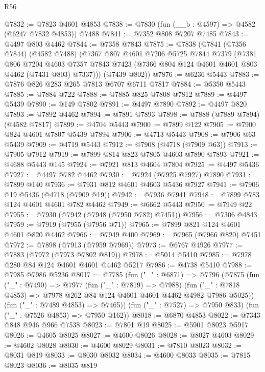 \begin{lexlean}{R56}
\begin{coremodule}
@7832 := @7823 @4601 @4853
@7838 := @7830 (fun (__b : @4597) => @4582 (@6247 @7832 @4853)) @7488
@7841 := @7352 @808 @7207 @7485
@7843 := @4497 @803 @4462
@7844 := @7358 @7843
@7875 := @7838
    (@7841
      (@7356 @7844)
      (@4582 @7488)
      (@7367
        @807
        @4601
        @7206
        @5725
        @7844
        @7379
        (@7381
          @806
          @7204
          @4603
          @7357
          @7843
          @7423
          (@7366 @804 @124 @4601 @4601 @803 @4462 (@7431 @803) @7337)))
      (@7439 @802))
@7876 := @6236 @5443
@7883 := @7876 @826 @283 @265 @7813 @6707 @6711 @7817
@7884 := @5350 @5443
@7885 := @7884 @722
@7888 := @7885 @825 @7808 @7812
@7889 := @4497 @5439
@7890 := @149 @7802
@7891 := @4497 @7890
@7892 := @4497 @820
@7893 := @7892 @4462
@7894 := @7891 @7893
@7898 := @7888 (@7889 @7894) (@4582 @7817)
@7899 := @4704 @5443
@7900 := @7899 @122
@7905 := @7900 @824 @4601 @7807 @5439 @7894
@7906 := @4713 @5443
@7908 := @7906 @63 @5439
@7909 := @4719 @5443
@7912 := @7908 (@4718 (@7909 @63))
@7913 := @7905 @7912
@7919 := @7899 @814 @823 @7805 @4603 @7890 @7893
@7921 := @4688 @5443 @145
@7924 := @7921 @813 @4604 @7804
@7925 := @4497 @5436
@7927 := @4497 @782 @4462
@7930 := @7924 (@7925 @7927) @7890
@7931 := @7899 @140
@7936 := @7931 @812 @4601 @4603 @5436 @7927
@7941 := @7906 @19 @5436 (@4718 (@7909 @19))
@7942 := @7936 @7941
@7948 := @7899 @783 @124 @4601 @4601 @782 @4462
@7949 := @6662 @5443
@7950 := @7949 @22
@7955 := @7930 (@7942 (@7948 (@7950 @782) @7451))
@7956 := @7306 @4843
@7959 := @7919 (@7955 (@7956 @71))
@7965 := @7899 @821 @124 @4601 @4601 @820 @4462
@7966 := @7949 @400
@7969 := @7965 (@7966 @820) @7451
@7972 := @7898 (@7913 (@7959 @7969))
@7973 := @6767 @4926
@7977 := @7883 (@7972 (@7973 @7802 @819))
@7978 := @5014 @5410
@7985 := @7978 @280 @84 @124 @4601 @4601 @4462 @5217
@7986 := @4738 @5410
@7988 := @7985 @7986 @5236
@8017 := @7785
    (fun ("_" : @6871) =>
    @7796
      (@7875
        (fun ("_" : @7490) =>
        @7977
          (fun ("_" : @7819) => @7988)
          (fun ("_" : @7818 @4853) => @7978 @262 @84 @124 @4601 @4601 @4462 @4982 @7986 @5025))
        (fun ("_" : @7489 @4853) => @7465))
      (fun ("_" : @7527) => @7950 @833)
      (fun ("_" : @7526 @4853) => @7950 @162))
@8018 := @6870 @4853
@8022 := @7343 @848 @946 @966 @7538
@8023 := @7801 @19
@8025 := @5901 @8023 @5917
@8026 := @4605 @8025
@8027 := @4600 @8026
@8028 := @8027 @4603
@8029 := @4602 @8028
@8030 := @4600 @8029
@8031 := @7810 @8023
@8032 := @8031 @819
@8033 := @8030 @8032
@8034 := @4600 @8033
@8035 := @7815 @8023
@8036 := @8035 @819

\end{coremodule}
\end{lexlean}
